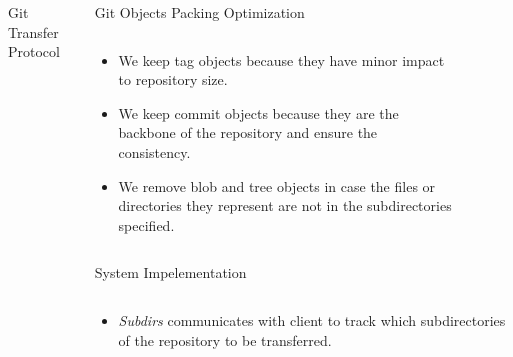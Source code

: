 \documentclass[final]{beamer}
\begin{document}
\begin{frame}[t]
\begin{columns}[t]
\begin{column}{.5\linewidth}
\begin{block}{Git Transfer Protocol}
      \end{block}
    \end{column}
    \begin{column}{.5\linewidth}
      \begin{block}{Git Objects Packing Optimization}
        \begin{columns}[T]
          \begin{column}{.5\textwidth}
\begin{itemize}
  \item We keep tag objects because they have minor impact to repository size.

  \item We keep commit objects because they are the backbone of the repository
    and ensure the consistency.

  \item We remove blob and tree objects in case the files or directories they
    represent are not in the subdirectories specified.

\end{itemize}
          \end{column}
          \begin{column}{.5\textwidth}
              \begin{figure} \centering
              \end{figure}
              \begin{figure} \centering
              \end{figure}
              \begin{figure} \centering
              \end{figure}
          \end{column}
        \end{columns}
      \end{block}
      \begin{block}{System Impelementation}
        \begin{columns}[T]
          \begin{column}{.3\textwidth}
\begin{itemize}
  \item \emph{Subdirs} communicates with client to track which subdirectories
    of the repository to be transferred.


\end{itemize}
\end{column}
\end{columns}
\end{block}
\end{column}
\end{columns}
\end{frame}
\end{document}
